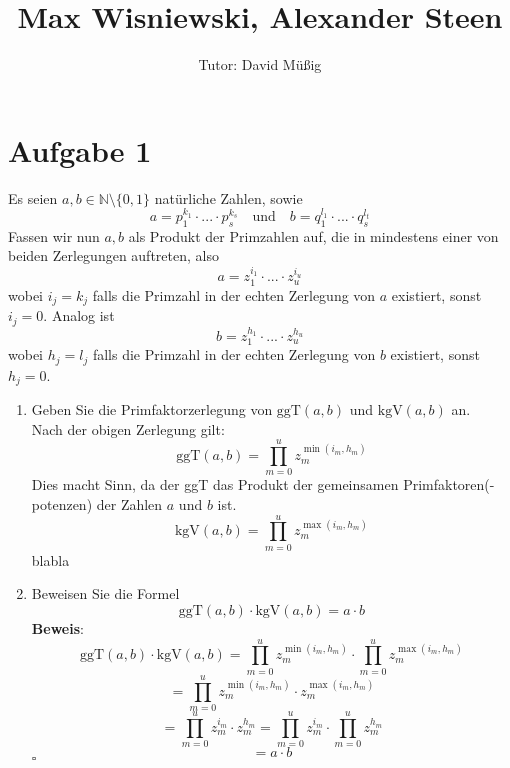 \documentclass[11pt,a4paper,ngerman]{article}
\author{Tutor: David Müßig}
\date{}
\title{Max Wisniewski, Alexander Steen}
\newcommand{\N}{\mathbb{N}}
\newcommand{\ggT}{\text{ggT}}
\newcommand{\kgV}{\text{kgV}}
\begin{document}

\maketitle
\thispagestyle{fancy}


\section*{Aufgabe 1}

Es seien $a,b \in \N \setminus \{ 0,1 \}$ natürliche Zahlen, sowie
$$
a= p_1^{k_1}\cdot ...\cdot p_s^{k_s} \quad \text{und} \quad b = q_1^{l_1} \cdot ... \cdot q_s^{l_t}
$$
Fassen wir nun $a, b$ als Produkt der Primzahlen auf, die in mindestens einer von beiden Zerlegungen auftreten, also
$$ a= z_1^{i_1}\cdot ...\cdot z_u^{i_u} $$
wobei $i_j = k_j $ falls die Primzahl in der echten Zerlegung von $a$ existiert, sonst $i_j = 0$. Analog ist
$$ b = z_1^{h_1}\cdot ...\cdot z_u^{h_u} $$
wobei $h_j = l_j $ falls die Primzahl in der echten Zerlegung von $b$ existiert, sonst $h_j = 0$.
\begin{enumerate}[\bfseries a)]
\item Geben Sie die Primfaktorzerlegung von $\ggT (a,b)$ und $\kgV (a,b)$ an.\\
Nach der obigen Zerlegung gilt:
$$ \ggT(a,b) = \prod_{m=0}^{u} z_m^{\min{(i_m,h_m)}}$$
Dies macht Sinn, da der ggT das Produkt der gemeinsamen Primfaktoren(-potenzen) der Zahlen $a$ und $b$ ist. 
$$ \kgV(a,b) = \prod_{m=0}^{u} z_m^{\max{(i_m,h_m)}}$$
blabla
\item Beweisen Sie die Formel
$$ \ggT (a,b) \cdot \kgV (a,b) = a \cdot b $$
\textbf{Beweis}: \\
$$ \ggT (a,b) \cdot \kgV (a,b) = \prod_{m=0}^{u} z_m^{\min{(i_m,h_m)}} \cdot \prod_{m=0}^{u} z_m^{\max{(i_m,h_m)}} $$
$$ = \prod_{m=0}^{u} z_m^{\min{(i_m,h_m)}} \cdot z_m^{\max{(i_m,h_m)}} $$
$$ = \prod_{m=0}^{u} z_m^{i_m} \cdot z_m^{h_m} = \prod_{m=0}^{u} z_m^{i_m} \cdot \prod_{m=0}^{u} z_m^{h_m} $$
$$ = a \cdot b $$
\mbox{} \hfill $\square$
\end{enumerate}
\end{document}
